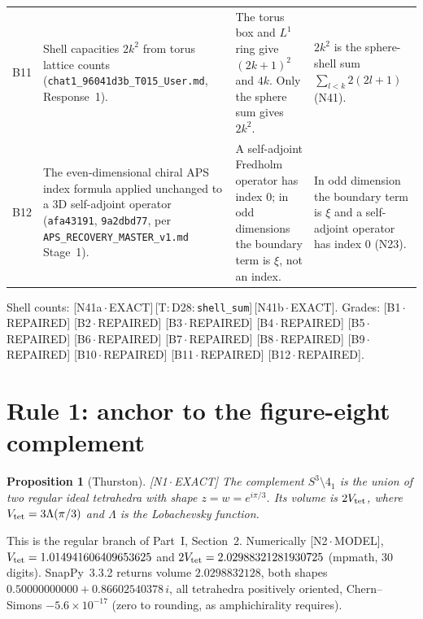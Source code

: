 \documentclass[11pt]{article}
\newtheorem{proposition}[theorem]{Proposition}
\theoremstyle{definition}
\newcommand{\lean}[1]{\texttt{\small #1}}
\newcommand{\dtag}[1]{#1}
\begin{document}
\begin{longtable}{@{}L{0.06\textwidth}L{0.34\textwidth}L{0.25\textwidth}L{0.25\textwidth}@{}}
B11 & Shell capacities $2k^2$ from torus lattice counts (\texttt{chat1\_\allowbreak{}96041d3b\_\allowbreak{}T015\_\allowbreak{}User.md}, Response~1). & The torus box and $L^1$ ring give $(2k+1)^2$ and $4k$. Only the sphere sum gives $2k^2$. & $2k^2$ is the sphere-shell sum $\sum_{l<k}2(2l+1)$ (N41).\\
B12 & The even-dimensional chiral APS index formula applied unchanged to a 3D self-adjoint operator (\texttt{afa43191}, \texttt{9a2dbd77}, per \texttt{APS\_\allowbreak{}RECOVERY\_\allowbreak{}MASTER\_\allowbreak{}v1.md} Stage~1). & A self-adjoint Fredholm operator has index $0$; in odd dimensions the boundary term is $\xi$, not an index. & In odd dimension the boundary term is $\xi$ and a self-adjoint operator has index $0$ (N23).\\
\bottomrule
\end{longtable}
Shell counts: \dtag{ \textsf{\small[N41a\,$\cdot$\,EXACT]}\,\textsf{\small[T:\,D28:\,\lean{shell\_\allowbreak{}sum}]}\,\textsf{\small[N41b\,$\cdot$\,EXACT]}}. Grades: \textsf{\small[B1\,$\cdot$\,REPAIRED]} \textsf{\small[B2\,$\cdot$\,REPAIRED]} \textsf{\small[B3\,$\cdot$\,REPAIRED]} \textsf{\small[B4\,$\cdot$\,REPAIRED]} \textsf{\small[B5\,$\cdot$\,REPAIRED]} \textsf{\small[B6\,$\cdot$\,REPAIRED]} \textsf{\small[B7\,$\cdot$\,REPAIRED]} \textsf{\small[B8\,$\cdot$\,REPAIRED]} \textsf{\small[B9\,$\cdot$\,REPAIRED]} \textsf{\small[B10\,$\cdot$\,REPAIRED]} \textsf{\small[B11\,$\cdot$\,REPAIRED]} \textsf{\small[B12\,$\cdot$\,REPAIRED]}.

\section{Rule 1: anchor to the figure-eight complement}\label{sec:rule1}
\begin{proposition}[Thurston]\dtag{\textsf{\small[N1\,$\cdot$\,EXACT]}}
The complement $S^3\setminus4_1$ is the union of two regular ideal tetrahedra with shape $z=w=e^{i\pi/3}$. Its volume is $2V_{\rm tet}$, where $V_{\rm tet}=3\Lambda(\pi/3)$ and $\Lambda$ is the Lobachevsky function.
\end{proposition}
This is the regular branch of Part~I, Section~2. Numerically \dtag{\textsf{\small[N2\,$\cdot$\,MODEL]}}, $V_{\rm tet}=1.014941606409653625$ and $2V_{\rm tet}=2.02988321281930725$ (mpmath, 30 digits). SnapPy~3.3.2 returns volume $2.0298832128$, both shapes $0.50000000000+0.86602540378\,i$, all tetrahedra positively oriented, Chern--Simons $-5.6\times10^{-17}$ (zero to rounding, as amphichirality requires).
\end{document}
